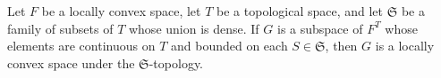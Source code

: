 Let $F$ be a locally convex space, let $T$ be a topological space, and let $\mathfrak{S}$ be a family of subsets of $T$ whose union is dense. If $G$ is a subspace of $F^T$ whose elements are continuous on $T$ and bounded on each $S \in \mathfrak{S}$, then $G$ is a locally convex space under the $\mathfrak{S}$-topology.

